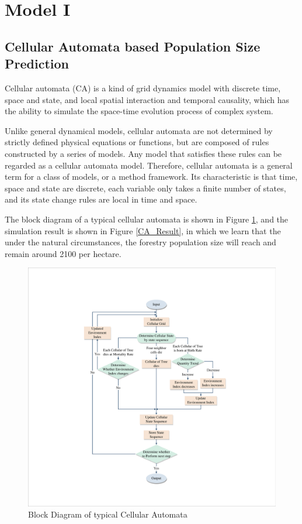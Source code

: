 \documentclass{mcmthesis}
\numberwithin{figure}{section}
\numberwithin{table}{section}
\numberwithin{equation}{section}
\begin{document}
\section{Model I}
\subsection{Cellular Automata based Population Size Prediction}

Cellular automata (CA) is a kind of grid dynamics model with discrete time, 
space and state, and local spatial interaction and temporal causality, which 
has the ability to simulate the space-time evolution process of complex system.
\par
Unlike general dynamical models, cellular automata are not determined by strictly 
defined physical equations or functions, but are composed of rules constructed by 
a series of models. Any model that satisfies these rules can be regarded as a cellular 
automata model. Therefore, cellular automata is a general term for a class of models, 
or a method framework. Its characteristic is that time, space and state are discrete, 
each variable only takes a finite number of states, and its state change rules are local 
in time and space.
\par
The block diagram of a typical cellular automata is shown in Figure \ref{CA_Fig}, 
and the simulation result is shown in Figure \ref{CA_Result}, in which
we learn that the under the natural circumstances, the forestry population size
will reach and remain around 2100 per hectare. 



\begin{figure}[htbp]
  \centering
  \includegraphics[width = 12cm]{code&pic/元胞自动机流程图.pdf}
  \caption{Block Diagram of typical Cellular Automata}\label{CA_Fig}
\end{figure}
\end{document}
